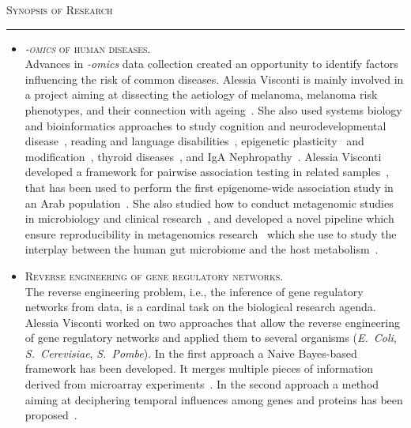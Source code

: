 \documentclass[a4paper,10pt]{article}
\newcommand{\mediumtitle}[1]{
	\vspace{0.2cm}
	{\noindent
	\Large \textsc{#1}\\[-2ex]
	\hrule
	\vspace{0.2cm}}
}
\newcommand{\smalltitle}[1]{
	\vspace{0.1cm}
	{\noindent 
	\large \textsc{#1}}
	\vspace{0.1cm}
}
\newcommand{\bulletitem}{\item[$\bullet$]}
\begin{document}
\newpage


\mediumtitle{Synopsis of Research}

\begin{itemize}
	
\bulletitem \smalltitle{\emph{-omics} of human diseases.}\\
Advances in \emph{-omics} data collection created an opportunity to identify factors influencing the risk of common diseases. Alessia Visconti is mainly involved in a project aiming at dissecting the aetiology of melanoma, melanoma risk phenotypes, and their connection with ageing~\cite{Rib16,Pui16,Hys18,Vis18a,Duf17,Vis19a,Vis20,Lan20,Swi15}. 
She also used systems biology and bioinformatics approaches to study cognition and neurodevelopmental disease~\cite{Joh15,Cul18}, reading and language disabilities~\cite{Gia16}, epigenetic plasticity~\cite{Car16} and modification~\cite{Zag18}, thyroid diseases~\cite{Mar20}, and IgA Nephropathy~\cite{Lom16}. Alessia Visconti developed a framework for pairwise association testing in related samples~\cite{Vis16}, that has been used to perform the first epigenome-wide association study in an Arab population~\cite{AlM15}. She also studied how to conduct metagenomic studies in microbiology and clinical research~\cite{Vis18c}, and developed a novel pipeline which ensure reproducibility in metagenomics research~\cite{Vis18b} which she use to study the interplay between the human gut microbiome and the host metabolism~\cite{Vis19}.
	
\bulletitem \smalltitle{Reverse engineering of gene regulatory networks.}\\
The reverse engineering problem, i.e., the inference of gene regulatory networks from data, is a cardinal task on the biological research agenda.
Alessia Visconti worked on two approaches that allow the reverse engineering of gene regulatory networks and applied them to several organisms (\emph{E.~Coli}, \emph{S.~Cerevisiae}, \emph{S.~Pombe}). In the first approach a Naive Bayes-based framework has been developed. It merges multiple pieces of information derived from microarray experiments~\cite{Mar12, Vis11b}. In the second approach a method aiming at deciphering temporal influences among genes and proteins has been proposed~\cite{Vis12b}. 


\end{itemize}
\end{document}
